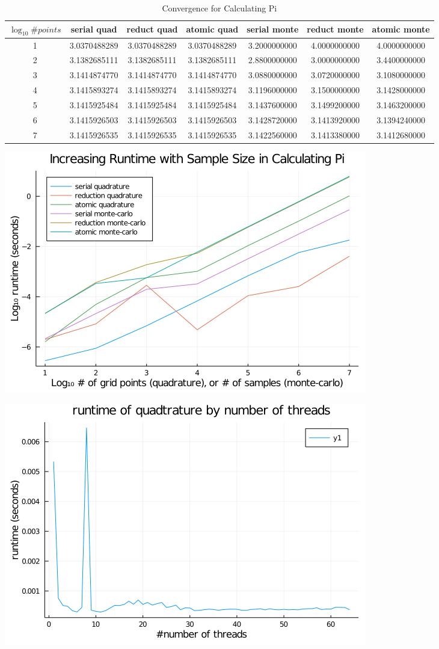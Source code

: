 \documentclass{article}
\begin{document}
\begin{table}
  \caption {Convergence for Calculating Pi} \label{tab:title} 
  \small
\begin{flushleft}
\begin{tabular} {| c | c | c | c | c | c | c |}
  \hline
  $\log_{10} \# points$ & serial quad & reduct quad & atomic quad & serial monte & reduct monte & atomic monte \\
  \hline
  1 & 3.0370488289 & 3.0370488289 & 3.0370488289 & 3.2000000000 & 4.0000000000 & 4.0000000000 \\

  2 & 3.1382685111 & 3.1382685111 & 3.1382685111 & 2.8800000000 & 3.0000000000 & 3.4400000000 \\

  3 & 3.1414874770 & 3.1414874770 & 3.1414874770 & 3.0880000000 & 3.0720000000 & 3.1080000000 \\

  4 & 3.1415893274 & 3.1415893274 & 3.1415893274 & 3.1196000000 & 3.1500000000 & 3.1428000000 \\

  5 & 3.1415925484 & 3.1415925484 & 3.1415925484 & 3.1437600000 & 3.1499200000 & 3.1463200000 \\

  6 & 3.1415926503 & 3.1415926503 & 3.1415926503 & 3.1428720000 & 3.1413920000 & 3.1394240000 \\
  
  7 & 3.1415926535 & 3.1415926535 & 3.1415926535 & 3.1422560000 & 3.1413380000 & 3.1412680000 \\
\end{tabular}
\end{flushleft}
\end{table}


\includegraphics[scale=.45]{hw1_plot.png}

\includegraphics[scale=.45]{threads_runtime.png}
\end{document}
